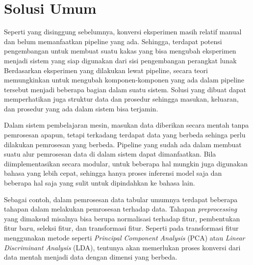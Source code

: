 \section{Solusi Umum}

Seperti yang disinggung sebelumnya, konversi eksperimen masih relatif manual dan belum memanfaatkan pipeline yang ada.
Sehingga, terdapat potensi pengembangan untuk membuat suatu kakas yang bisa mengubah eksperimen menjadi sistem yang siap digunakan dari sisi pengembangan perangkat lunak
Berdasarkan eksperimen yang dilakukan lewat pipeline, secara teori memungkinkan untuk mengubah komponen-komponen yang ada dalam pipeline tersebut menjadi beberapa bagian dalam suatu sistem.
Solusi yang dibuat dapat memperhatikan juga struktur data dan prosedur sehingga masukan, keluaran, dan prosedur yang ada dalam sistem bisa terjamin.

Dalam sistem pembelajaran mesin, masukan data diberikan secara mentah tanpa pemrosesan apapun, tetapi terkadang terdapat data yang berbeda sehinga perlu dilakukan pemrosesan yang berbeda.
Pipeline yang sudah ada dalam membuat suatu alur pemrosesan data di dalam sistem dapat dimanfaatkan.
Bila diimplementasikan secara modular, untuk beberapa hal mungkin juga digunakan bahasa yang lebih cepat, sehingga hanya proses inferensi model saja dan beberapa hal saja yang sulit untuk dipindahkan ke bahasa lain.

Sebagai contoh, dalam pemrosesan data tabular umumnya terdapat beberapa tahapan dalam melakukan pemrosesan terhadap data.
Tahapan \textit{preprocessing} yang dimaksud misalnya bisa berupa normalisasi terhadap fitur, pembentukan fitur baru, seleksi fitur, dan transformasi fitur.
Seperti pada transformasi fitur menggunakan metode seperti \textit{Principal Component Analysis} (PCA) atau \textit{Linear Discriminant Analysis} (LDA), tentunya akan memerlukan proses konversi dari data mentah menjadi data dengan dimensi yang berbeda.


